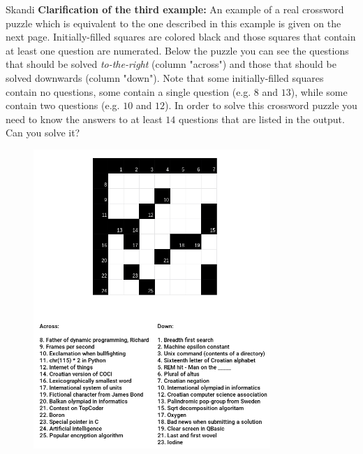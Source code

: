 \begin{statement}[
  problempoints=110,
  timelimit=10 seconds,
  memorylimit=512 MiB,
]{Skandi}
\textbf{Clarification of the third example:}
An example of a real crossword puzzle which is equivalent to the one described
in this example is given on the next page. Initially-filled squares are colored
black and those squares that contain at least one question are numerated. Below
the puzzle you can see the questions that should be solved \textit{to-the-right}
(column "across") and those that should be solved downwards (column "down").
Note that some initially-filled squares contain no questions, some contain
a single question (e.g. $8$ and $13$), while some contain two questions
(e.g. $10$ and $12$). In order to solve this crossword puzzle you need to
know the answers to at least $14$ questions that are listed in the output.
Can you solve it?

\setlength\intextsep{-0.5cm}
\begin{figure}
\centering
\includegraphics[width=0.8\textwidth]{skandi_en.png}
\end{figure}

\end{statement}

